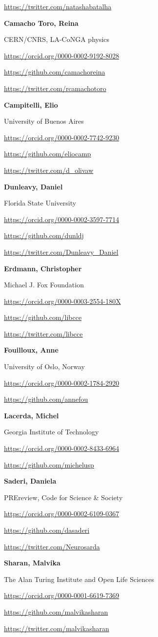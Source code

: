 \documentclass[
  letterpaper,
  DIV=11,
  numbers=noendperiod]{scrreport}
\begin{document}
\url{https://twitter.com/natashabatalha}

\textbf{Camacho Toro, Reina}

CERN/CNRS, LA-CoNGA physics

\url{https://orcid.org/0000-0002-9192-8028}

\url{https://github.com/camachoreina}

\url{https://twitter.com/rcamachotoro}

\textbf{Campitelli, Elio}

University of Buenos Aires

\url{https://orcid.org/0000-0002-7742-9230}

\url{https://github.com/eliocamp}

\url{https://twitter.com/d_olivaw}

\textbf{Dunleavy, Daniel}

Florida State University

\url{https://orcid.org/0000-0002-3597-7714}

\url{https://github.com/dunldj}

\url{https://twitter.com/Dunleavy_Daniel}

\textbf{Erdmann, Christopher}

Michael J. Fox Foundation

\url{https://orcid.org/0000-0003-2554-180X}

\url{https://github.com/libcce}

\url{https://twitter.com/libcce}

\textbf{Fouilloux, Anne}

University of Oslo, Norway

\url{https://orcid.org/0000-0002-1784-2920}

\url{https://github.com/annefou}

\textbf{Lacerda, Michel}

Georgia Institute of Technology

\url{https://orcid.org/0000-0002-8433-6964}

\url{https://github.com/michelusp}

\textbf{Saderi, Daniela}

PREreview, Code for Science \& Society

\href{}{https://orcid.org/0000-0002-6109-0367}

\url{https://github.com/dasaderi}

\url{https://twitter.com/Neurosarda}

\textbf{Sharan, Malvika}

The Alan Turing Institute and Open Life Sciences

\url{https://orcid.org/0000-0001-6619-7369}

\url{https://github.com/malvikasharan}

\url{https://twitter.com/malvikasharan}
\end{document}
